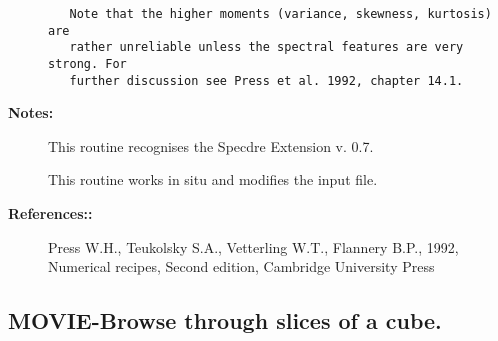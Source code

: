 \begin{description}
\begin{verbatim}
   Note that the higher moments (variance, skewness, kurtosis) are
   rather unreliable unless the spectral features are very strong. For
   further discussion see Press et al. 1992, chapter 14.1.
\end{verbatim}

\item [{\bf Notes:}]
This routine recognises the Specdre Extension v. 0.7.

This routine works in situ and modifies the input file.

\item [{\bf References::}]
   Press W.H., Teukolsky S.A., Vetterling W.T., Flannery B.P., 1992,
   Numerical recipes, Second edition, Cambridge University Press

\end{description}
\subsection{MOVIE-\label{MOVIE}Browse through slices of a cube.}
